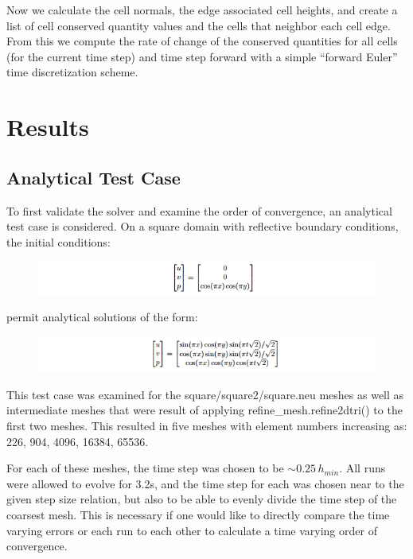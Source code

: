 \documentclass[letterpaper,10pt]{article}
\begin{document}
Now we calculate the cell normals, the edge associated cell heights, and create a list of cell conserved quantity values and the cells that neighbor each cell edge. From this we compute the rate of change of the conserved quantities for all cells (for the current time step) and time step forward with a simple ``forward Euler'' time discretization scheme.

\section*{Results}

\subsection*{Analytical Test Case}
To first validate the solver and examine the order of convergence, an analytical test case is considered. On a square domain with reflective boundary conditions, the initial conditions:
\begin{figure}[!htb]
\includegraphics[width=1\textwidth]{8.PNG}
\end{figure}

permit analytical solutions of the form:
\begin{figure}[!htb]
\includegraphics[width=1\textwidth]{9.PNG}
\end{figure}

This test case was examined for the square/square2/square.neu meshes as well as intermediate meshes that were result of applying refine\_mesh.refine2dtri() to the first two meshes. This resulted in five meshes with element numbers increasing as: 226, 904, 4096, 16384, 65536.

For each of these meshes, the time step was chosen to be $\sim 0.25 \, h_{min}$. All runs were allowed to evolve for 3.2s, and the time step for each was chosen near to the given step size relation, but also to be able to evenly divide the time step of the coarsest mesh. This is necessary if one would like to directly compare the time varying errors or each run to each other to calculate a time varying order of convergence.
\end{document}

